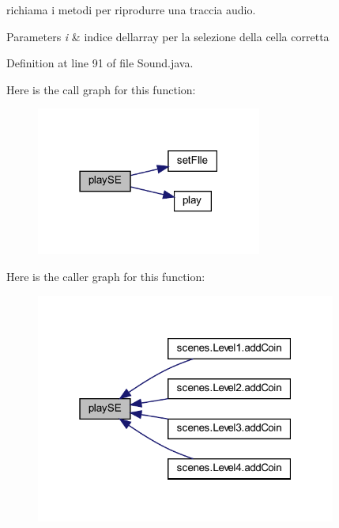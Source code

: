 richiama i metodi per riprodurre una traccia audio. 


\begin{DoxyParams}{Parameters}
{\em i} & indice dell\textquotesingle{}array per la selezione della cella corretta \\
\hline
\end{DoxyParams}


Definition at line 91 of file Sound.\+java.

Here is the call graph for this function\+:\nopagebreak
\begin{figure}[H]
\begin{center}
\leavevmode
\includegraphics[width=210pt]{classprogetto_1_1_sound_a98228f023eb842c07bae8aa04a26db94_cgraph}
\end{center}
\end{figure}
Here is the caller graph for this function\+:\nopagebreak
\begin{figure}[H]
\begin{center}
\leavevmode
\includegraphics[width=280pt]{classprogetto_1_1_sound_a98228f023eb842c07bae8aa04a26db94_icgraph}
\end{center}
\end{figure}
\mbox{\label{classprogetto_1_1_sound_a7dfb2cac645e127badf36478fd7aaa40}} 
